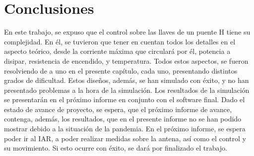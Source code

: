 \section{Conclusiones}
En este trabajo, se expuso que el control sobre las llaves de un puente H tiene su complejidad. En él, se tuvieron que tener en cuentan todos los detalles en el aspecto teórico, desde la corriente máxima que circulará por él, potencia a disipar, resistencia de encendido, y temperatura. Todos estos aspectos, se fueron resolviendo de a uno en el presente capítulo, cada uno, presentando distintos grados de dificultad. Estos diseños, además, se han simulado con éxito, y no han presentado problemas a la hora de la simulación. Los resultados de la simulación se presentarán en el próximo informe en conjunto con el software final. Dado el estado de avance de proyecto, se espera, que el próximo informe de avance, contenga, además, los resultados, que en el presente informe no se han podido mostrar debido a la situación de la pandemia. En el próximo informe, se espera poder ir al IAR, a poder realizar medidas sobre la antena, así como el control y su movimiento. Si esto ocurre con éxito, se dará por finalizado el trabajo. 
